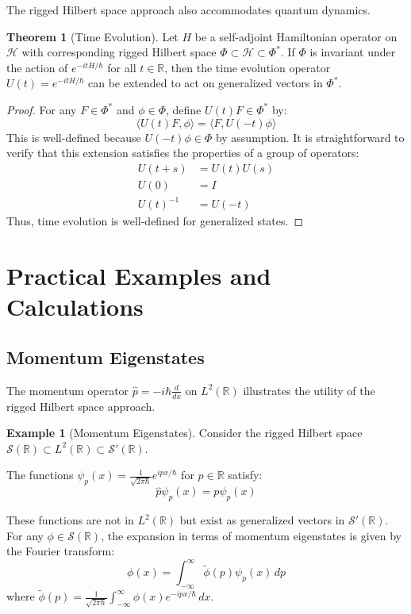 \documentclass[12pt,a4paper]{article}
\theoremstyle{definition}
\newtheorem{theorem}{Theorem}
\newtheorem{example}{Example}
\begin{document}
The rigged Hilbert space approach also accommodates quantum dynamics.

\begin{theorem}[Time Evolution]
Let $H$ be a self-adjoint Hamiltonian operator on $\mathcal{H}$ with corresponding rigged Hilbert space $\Phi \subset \mathcal{H} \subset \Phi^*$. If $\Phi$ is invariant under the action of $e^{-itH/\hbar}$ for all $t \in \mathbb{R}$, then the time evolution operator $U(t) = e^{-itH/\hbar}$ can be extended to act on generalized vectors in $\Phi^*$.
\end{theorem}

\begin{proof}
For any $F \in \Phi^*$ and $\phi \in \Phi$, define $U(t)F \in \Phi^*$ by:
\begin{equation}
    \langle U(t)F, \phi \rangle = \langle F, U(-t)\phi \rangle
\end{equation}
This is well-defined because $U(-t)\phi \in \Phi$ by assumption. It is straightforward to verify that this extension satisfies the properties of a group of operators:
\begin{align}
    U(t+s) &= U(t)U(s) \\
    U(0) &= I \\
    U(t)^{-1} &= U(-t)
\end{align}
Thus, time evolution is well-defined for generalized states.
\end{proof}

\section{Practical Examples and Calculations}

\subsection{Momentum Eigenstates}

The momentum operator $\hat{p} = -i\hbar\frac{d}{dx}$ on $L^2(\mathbb{R})$ illustrates the utility of the rigged Hilbert space approach.

\begin{example}[Momentum Eigenstates]
Consider the rigged Hilbert space $\mathcal{S}(\mathbb{R}) \subset L^2(\mathbb{R}) \subset \mathcal{S}'(\mathbb{R})$.

The functions $\psi_p(x) = \frac{1}{\sqrt{2\pi\hbar}}e^{ipx/\hbar}$ for $p \in \mathbb{R}$ satisfy:
\begin{equation}
    \hat{p}\psi_p(x) = p\psi_p(x)
\end{equation}

These functions are not in $L^2(\mathbb{R})$ but exist as generalized vectors in $\mathcal{S}'(\mathbb{R})$. For any $\phi \in \mathcal{S}(\mathbb{R})$, the expansion in terms of momentum eigenstates is given by the Fourier transform:
\begin{equation}
    \phi(x) = \int_{-\infty}^{\infty} \tilde{\phi}(p) \psi_p(x) \, dp
\end{equation}
where $\tilde{\phi}(p) = \frac{1}{\sqrt{2\pi\hbar}}\int_{-\infty}^{\infty} \phi(x) e^{-ipx/\hbar} \, dx$.
\end{example}
\end{document}

